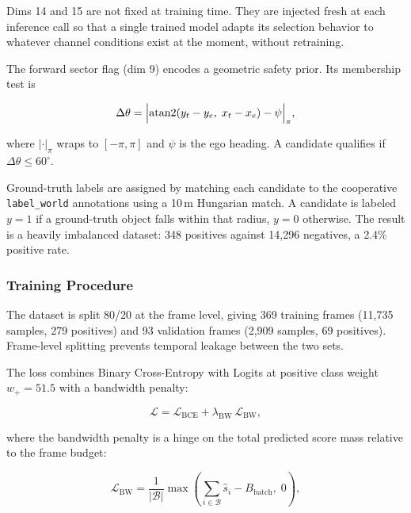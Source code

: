 \documentclass[12pt]{article}
\begin{document}
Dims 14 and 15 are not fixed at training time. They are injected fresh at each inference call so that a single trained model adapts its selection behavior to whatever channel conditions exist at the moment, without retraining.

\medskip
The forward sector flag (dim 9) encodes a geometric safety prior. Its membership test is

\begin{equation}
    \Delta\theta =
    \Bigl|\operatorname{atan2}(y_t - y_e,\;x_t - x_e) - \psi\Bigr|_{\pi},
\end{equation}

\noindent where $|\cdot|_\pi$ wraps to $[-\pi,\pi]$ and $\psi$ is the ego heading. A candidate qualifies if $\Delta\theta \leq 60^\circ$.

\medskip
Ground-truth labels are assigned by matching each candidate to the cooperative \texttt{label\_world} annotations using a 10\,m Hungarian match. A candidate is labeled $y=1$ if a ground-truth object falls within that radius, $y=0$ otherwise. The result is a heavily imbalanced dataset: 348 positives against 14{,}296 negatives, a 2.4\% positive rate.

\subsubsection{Training Procedure}

The dataset is split 80/20 at the frame level, giving 369 training frames (11{,}735 samples, 279 positives) and 93 validation frames (2{,}909 samples, 69 positives). Frame-level splitting prevents temporal leakage between the two sets.

\medskip
The loss combines Binary Cross-Entropy with Logits at positive class weight $w_+ = 51.5$ with a bandwidth penalty:

\begin{equation}
    \mathcal{L} = \mathcal{L}_{\text{BCE}} + \lambda_{\text{BW}}\,\mathcal{L}_{\text{BW}},
    \label{eq:total_loss}
\end{equation}

\noindent where the bandwidth penalty is a hinge on the total predicted score mass relative to the frame budget:

\begin{equation}
    \mathcal{L}_{\text{BW}} = \frac{1}{|\mathcal{B}|}
    \max\!\left(\sum_{i \in \mathcal{B}} \hat{s}_i - B_{\text{batch}},\;0\right),
    \label{eq:bw_loss}
\end{equation}
\end{document}
